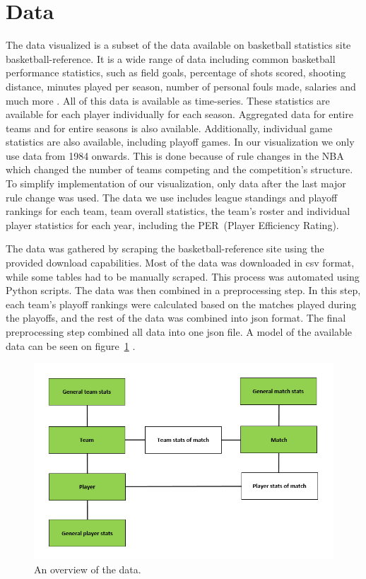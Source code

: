 \documentclass[chi_draft]{sigchi}
\begin{document}
\section{Data}\label{sec:data}
The data visualized is a subset of the data available on basketball statistics
site basketball-reference\cite{basketball-reference}. It is a wide range of data including common basketball performance statistics, such as field goals, percentage of shots scored, shooting distance, minutes played per season, number of personal fouls made, salaries and much more . All of this data is available as time-series. These statistics are available for each player individually for each season. Aggregated data for entire teams and for entire seasons is also available. Additionally, individual game statistics are also available, including playoff games. In our visualization we only use data from 1984 onwards. This is done because of rule changes in the NBA which changed the number of teams competing and the
competition's structure. To simplify implementation of our visualization, only
data after the last major rule change was used.  The data we use includes league
standings and playoff rankings for each team, team overall statistics, the
team's roster and individual player statistics for each year, including the
PER~(Player Efficiency Rating)\cite{per}. 

The data was gathered by scraping the basketball-reference site using the
provided download capabilities. Most of the data was downloaded in csv format,
while some tables had to be manually scraped. This process was automated using
Python scripts. The data was then combined in a preprocessing step. In this
step, each team's playoff rankings were calculated based on the matches played
during the playoffs, and the rest of the data was combined into json format. The
final preprocessing step combined all data into one json file. A model of the
available data can be seen on figure~\ref{fig:data} .

\begin{figure}
\centering
  \includegraphics[width=1.0\columnwidth]{figures/data}
  \caption{An overview of the data.}
  \label{fig:data}
\end{figure}
\end{document}
